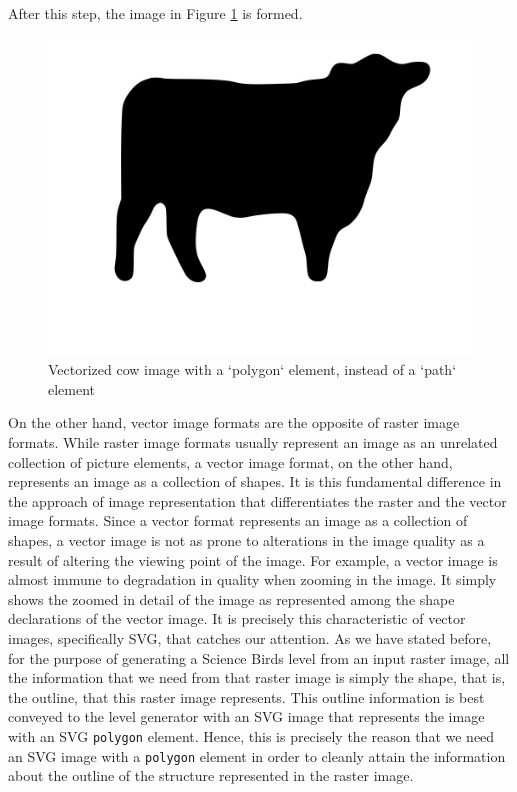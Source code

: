 \documentclass{dalthesis}
\begin{document}
\begin{enumerate}
  After this step, the image in Figure \ref{fig:cow_black_and_white_denoised_vectorized_polygon} is formed.

  \begin{figure}
    \centering
		\caption{Vectorized cow image with a `polygon` element, instead of a `path` element}
		\label{fig:cow_black_and_white_denoised_vectorized_polygon}
    \includegraphics[width=\textwidth,height=\textheight,keepaspectratio]{process/cow-black-and-white-denoised-polygon.jpg}
  \end{figure}
\end{enumerate}

On the other hand, vector image formats are the opposite of raster image formats. While raster image formats usually represent an image as an unrelated collection of picture elements, a vector image format, on the other hand, represents an image as a collection of shapes. It is this fundamental difference in the approach of image representation that differentiates the raster and the vector image formats. Since a vector format represents an image as a collection of shapes, a vector image is not as prone to alterations in the image quality as a result of altering the viewing point of the image. For example, a vector image is almost immune to degradation in quality when zooming in the image. It simply shows the zoomed in detail of the image as represented among the shape declarations of the vector image. It is precisely this characteristic of vector images, specifically SVG, that catches our attention. As we have stated before, for the purpose of generating a Science Birds level from an input raster image, all the information that we need from that raster image is simply the shape, that is, the outline, that this raster image represents. This outline information is best conveyed to the level generator with an SVG image that represents the image with an SVG \lstinline{polygon} element. Hence, this is precisely the reason that we need an SVG image with a \lstinline{polygon} element in order to cleanly attain the information about the outline of the structure represented in the raster image.
\end{document}
